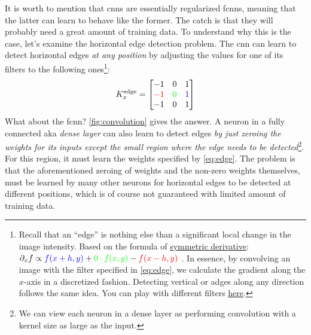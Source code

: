 It is worth to mention that \glspl{cnn} are essentially regularized \glspl{fcnn},
meaning that the latter can learn to behave like the former. The catch is that
they will probably need a great amount of training data. To understand why this
is the case, let's examine the horizontal edge detection problem. The
\gls{cnn} can learn to detect horizontal edges \emph{at any position} by
adjusting the values for one of its filters to the following
ones\footnote{Recall that an ``edge'' is nothing else than a significant
local change in the image intensity. Based on the formula of
\href{https://en.wikipedia.org/wiki/Symmetric_derivative}{symmetric derivative}:
$
    \partial_x f
	\propto \textcolor{blue}{f(x+h, y)}
	+ \textcolor{green}{0 \cdot f(x, y)}
	- \textcolor{red}{f(x-h, y)}
$
. In essence, by convolving an image with the filter specified in
\Equation{} \ref{eq:edge}, we calculate the gradient along the $x$-axis in a
discretized fashion. Detecting vertical or adges along any direction follows the
same idea. You can play with different filters
\href{https://setosa.io/ev/image-kernels/}{here}.}:
\begin{equation}
	\label{eq:edge}
	K_x^{\text{edge}} =
	\begin{bmatrix}
		-1 & 0 & 1 \\
		\color{red}{-1} & \color{green}{0} & \color{blue}{1} \\
		-1 & 0 & 1 \\
	\end{bmatrix}
\end{equation}
What about the \gls{fcnn}? \Figure{} \ref{fig:convolution} gives the answer. A
neuron in a fully connected aka \emph{dense layer} can also
learn to detect edges \emph{by just zeroing the weights for its inputs except
the small region where the edge needs to be detected}\footnote{We can view each
neuron in a dense layer as performing convolution with a kernel
size as large as the input.}. For this region, it must learn
the weights specified by \Equation{} \ref{eq:edge}.  The problem is that the
aforementioned zeroing of weights and the non-zero weights themselves, must be
learned by many other neurons for horizontal edges to be
detected at different positions, which is of course not guaranteed with limited
amount of training data.

